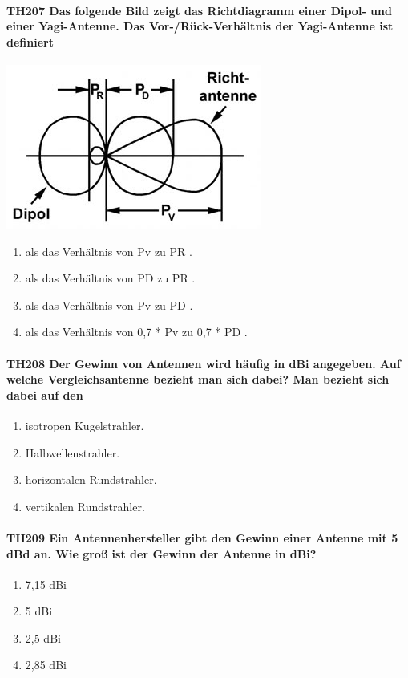 \documentclass[8pt]{article}
\begin{document}
\paragraph*{TH207 Das folgende Bild zeigt das Richtdiagramm einer Dipol- und einer Yagi-Antenne. Das Vor-/Rück-Verhältnis der Yagi-Antenne ist definiert}
\begin{center}
	\begin{minipage}{\linewidth}
		\centering
		\includegraphics[scale=1.0]{pics/th207_a.jpg}
	\end{minipage}
\end{center}
\begin{enumerate}[nolistsep,label=\Alph*]
\item als das Verhältnis von Pv zu PR .
\item als das Verhältnis von PD zu PR .
\item als das Verhältnis von Pv zu PD .
\item als das Verhältnis von 0,7 * Pv zu 0,7 * PD .
\end{enumerate}

\paragraph*{TH208 Der Gewinn von Antennen wird häufig in dBi angegeben. Auf welche Vergleichsantenne bezieht man sich dabei? Man bezieht sich dabei auf den}
\begin{enumerate}[nolistsep,label=\Alph*]
\item isotropen Kugelstrahler.
\item Halbwellenstrahler.
\item horizontalen Rundstrahler.
\item vertikalen Rundstrahler.
\end{enumerate}

\paragraph*{TH209 Ein Antennenhersteller gibt den Gewinn einer Antenne mit 5 dBd an. Wie groß ist der Gewinn der Antenne in dBi?}
\begin{enumerate}[nolistsep,label=\Alph*]
\item 7,15 dBi
\item 5 dBi
\item 2,5 dBi
\item 2,85 dBi
\end{enumerate}
\end{document}
